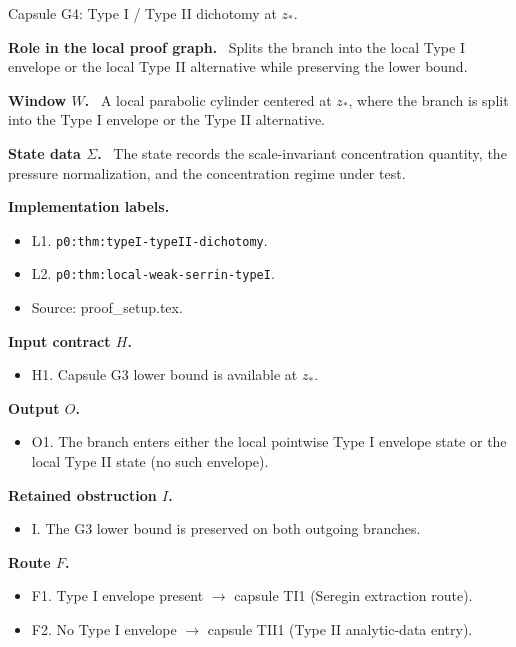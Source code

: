 \documentclass[11pt]{amsart}
\newcommand{\capsulefield}[1]{\par\smallskip\noindent\textbf{#1.}\ }
\begin{document}
\begin{proofcapsule}{Capsule G4: Type I / Type II dichotomy at $z_*$.}
  \capsulefield{Role in the local proof graph}
  Splits the branch into the local Type I envelope or the local Type II alternative while preserving the lower bound.

  \capsulefield{Window \(W\)}
A local parabolic cylinder centered at $z_*$, where the branch is split into the Type I envelope or the Type II alternative.

  \capsulefield{State data \(\Sigma\)}
The state records the scale-invariant concentration quantity, the pressure normalization, and the concentration regime under test.

  \capsulefield{Implementation labels}
  \begin{itemize}[leftmargin=1.8em]
  \item L1. \texttt{p0:thm:typeI-typeII-dichotomy}.
  \item L2. \texttt{p0:thm:local-weak-serrin-typeI}.
  \item Source: proof\_setup.tex.
  \end{itemize}

  \capsulefield{Input contract \(H\)}
  \begin{itemize}[leftmargin=1.8em]
  \item H1. Capsule G3 lower bound is available at $z_*$.
  \end{itemize}

  \capsulefield{Output \(O\)}
  \begin{itemize}[leftmargin=1.8em]
  \item O1. The branch enters either the local pointwise Type I envelope state or the local Type II state (no such envelope).
  \end{itemize}

  \capsulefield{Retained obstruction \(I\)}
  \begin{itemize}[leftmargin=1.8em]
  \item I. The G3 lower bound is preserved on both outgoing branches.
  \end{itemize}

  \capsulefield{Route \(F\)}
  \begin{itemize}[leftmargin=1.8em]
  \item F1. Type I envelope present $\to$ capsule TI1 (Seregin extraction route).
  \item F2. No Type I envelope $\to$ capsule TII1 (Type II analytic-data entry).
  \end{itemize}


\end{proofcapsule}
\end{document}

